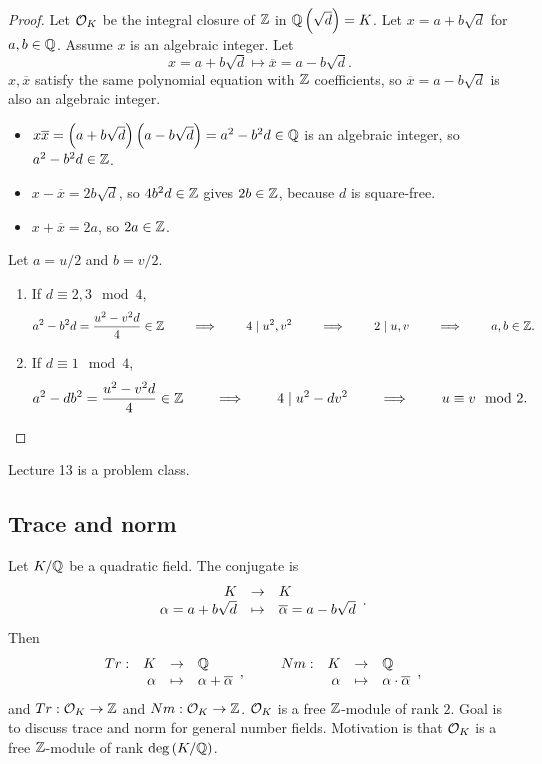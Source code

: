 \begin{proof}
Let $ \mathcal{O}_K $ be the integral closure of $ \mathbb{Z} $ in $ \mathbb{Q}\left( \sqrt{d} \right) = K $. Let $ x = a + b\sqrt{d} $ for $ a, b \in \mathbb{Q} $. Assume $ x $ is an algebraic integer. Let
$$ x = a + b\sqrt{d} \mapsto \overline{x} = a - b\sqrt{d}. $$
$ x, \overline{x} $ satisfy the same polynomial equation with $ \mathbb{Z} $ coefficients, so $ \overline{x} = a - b\sqrt{d} $ is also an algebraic integer.
\begin{itemize}
\item $ x\overline{x} = \left( a + b\sqrt{d} \right)\left( a - b\sqrt{d} \right) = a^2 - b^2d \in \mathbb{Q} $ is an algebraic integer, so $ a^2 - b^2d \in \mathbb{Z} $.
\item $ x - \overline{x} = 2b\sqrt{d} $, so $ 4b^2d \in \mathbb{Z} $ gives $ 2b \in \mathbb{Z} $, because $ d $ is square-free.
\item $ x + \overline{x} = 2a $, so $ 2a \in \mathbb{Z} $.
\end{itemize}
Let $ a = u / 2 $ and $ b = v / 2 $.
\begin{enumerate}
\item If $ d \equiv 2, 3 \mod 4 $,
$$ a^2 - b^2d = \dfrac{u^2 - v^2d}{4} \in \mathbb{Z} \qquad \implies \qquad 4 \mid u^2, v^2 \qquad \implies \qquad 2 \mid u, v \qquad \implies \qquad a, b \in \mathbb{Z}. $$
\item If $ d \equiv 1 \mod 4 $,
$$ a^2 - db^2 = \dfrac{u^2 - v^2d}{4} \in \mathbb{Z} \qquad \implies \qquad 4 \mid u^2 - dv^2 \qquad \implies \qquad u \equiv v \mod 2. $$
\end{enumerate}
\end{proof}


Lecture 13 is a problem class.

\pagebreak

\subsection{Trace and norm}


Let $ K / \mathbb{Q} $ be a quadratic field. The conjugate is
$$ \function{K}{K}{\alpha = a + b\sqrt{d}}{\overline{\alpha} = a - b\sqrt{d}}. $$
Then
$$ \function[Tr]{K}{\Q}{\alpha}{\alpha + \overline{\alpha}}, \qquad \function[Nm]{K}{\Q}{\alpha}{\alpha \cdot \overline{\alpha}}, $$
and $ Tr : \mathcal{O}_K \to \mathbb{Z} $ and $ Nm : \mathcal{O}_K \to \mathbb{Z} $. $ \mathcal{O}_K $ is a free $ \mathbb{Z} $-module of rank $ 2 $. Goal is to discuss trace and norm for general number fields. Motivation is that $ \mathcal{O}_K $ is a free $ \mathbb{Z} $-module of rank $ \deg\left( K / \mathbb{Q} \right) $.

